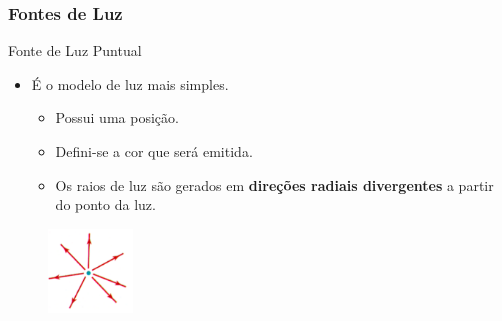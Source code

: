 \documentclass{beamer}
\begin{document}
\begin{frame}
\frametitle{Fontes de Luz}

	\begin{block}{Fonte de Luz Puntual}
		\begin{itemize}
			\item É o modelo de luz mais simples.
			\begin{itemize}
				\item Possui uma posição.
				\item Defini-se a cor que será emitida.
				\item Os raios de luz são gerados em \textbf{direções radiais divergentes} a partir do ponto da luz.
			\end{itemize}
		\end{itemize}
	\end{block}
		\begin{figure}[!h]
			\begin{center}
			\includegraphics[width=0.2\textwidth]{Figures/FonPun}
			\end{center}
		\end{figure}
\end{frame}
\end{document}
